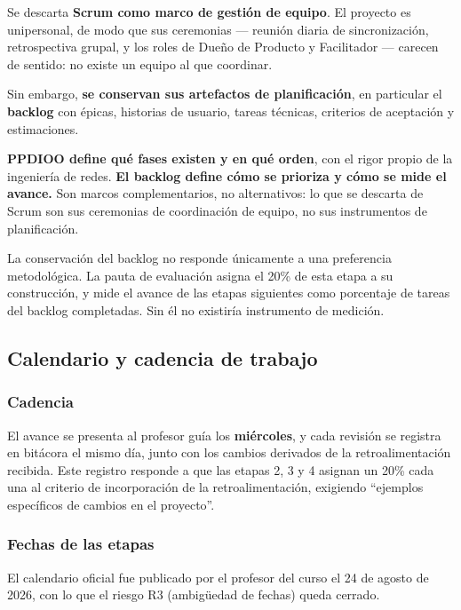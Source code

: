 Se descarta \textbf{Scrum como marco de gestión de equipo}. El proyecto es unipersonal, de modo que sus
ceremonias --- reunión diaria de sincronización, retrospectiva grupal, y los roles de Dueño de Producto
y Facilitador --- carecen de sentido: no existe un equipo al que coordinar.

Sin embargo, \textbf{se conservan sus artefactos de planificación}, en particular el \textbf{backlog}
con épicas, historias de usuario, tareas técnicas, criterios de aceptación y estimaciones.

\begin{cajaclave}[title={Formulación de la decisión metodológica}]
\textbf{PPDIOO define qué fases existen y en qué orden}, con el rigor propio de la ingeniería de redes.
\textbf{El backlog define cómo se prioriza y cómo se mide el avance.} Son marcos complementarios, no
alternativos: lo que se descarta de Scrum son sus ceremonias de coordinación de equipo, no sus
instrumentos de planificación.
\end{cajaclave}

La conservación del backlog no responde únicamente a una preferencia metodológica. La pauta de
evaluación asigna el 20\% de esta etapa a su construcción, y mide el avance de las etapas siguientes
como porcentaje de tareas del backlog completadas. Sin él no existiría instrumento de medición.

\subsection{Calendario y cadencia de trabajo}
\label{sec:calendario}

\subsubsection{Cadencia}

El avance se presenta al profesor guía los \textbf{miércoles}, y cada revisión se registra en bitácora
el mismo día, junto con los cambios derivados de la retroalimentación recibida. Este registro responde
a que las etapas 2, 3 y 4 asignan un 20\% cada una al criterio de incorporación de la
retroalimentación, exigiendo \enquote{ejemplos específicos de cambios en el proyecto}.

\subsubsection{Fechas de las etapas}

El calendario oficial fue publicado por el profesor del curso el 24 de agosto de 2026, con lo que el
riesgo R3 (ambigüedad de fechas) queda cerrado.

